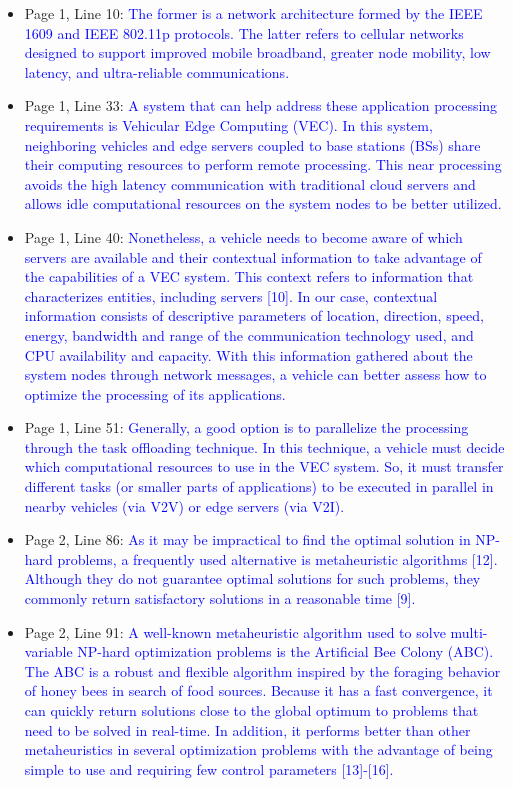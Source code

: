 \begin{itemize}
    \item Page 1, Line 10: \textcolor{blue}{The former is a network architecture formed by the IEEE 1609 and IEEE 802.11p protocols. The latter refers to cellular networks designed to support improved mobile broadband, greater node mobility, low latency, and ultra-reliable communications.}
    \item Page 1, Line 33: \textcolor{blue}{A system that can help address these application processing requirements is Vehicular Edge Computing (VEC). In this system, neighboring vehicles and edge servers coupled to base stations (BSs) share their computing resources to perform remote processing. This near processing avoids the high latency communication with traditional cloud servers and allows idle computational resources on the system nodes to be better utilized.}
    \item Page 1, Line 40: \textcolor{blue}{Nonetheless, a vehicle needs to become aware of which servers are available and their contextual information to take advantage of the capabilities of a VEC system. This context refers to information that characterizes entities, including servers [10]. In our case, contextual information consists of descriptive parameters of location, direction, speed, energy, bandwidth and range of the communication technology used, and CPU availability and capacity. With this information gathered about the system nodes through network messages, a vehicle can better assess how to optimize the processing of its applications.}
    \item Page 1, Line 51: \textcolor{blue}{Generally, a good option is to parallelize the processing through the task offloading technique. In this technique, a vehicle must decide which computational resources to use in the VEC system. So, it must transfer different tasks (or smaller parts of applications) to be executed in parallel in nearby vehicles (via V2V) or edge servers (via V2I).}
    \item Page 2, Line 86: \textcolor{blue}{As it may be impractical to find the optimal solution in NP-hard problems, a frequently used alternative is metaheuristic algorithms [12]. Although they do not guarantee optimal solutions for such problems, they commonly return satisfactory solutions in a reasonable time [9].}
    \item Page 2, Line 91: \textcolor{blue}{A well-known metaheuristic algorithm used to solve multi-variable NP-hard optimization problems is the Artificial Bee Colony (ABC). The ABC is a robust and flexible algorithm inspired by the foraging behavior of honey bees in search of food sources. Because it has a fast convergence, it can quickly return solutions close to the global optimum to problems that need to be solved in real-time. In addition, it performs better than other metaheuristics in several optimization problems with the advantage of being simple to use and requiring few control parameters [13]-[16].}

\end{itemize}
